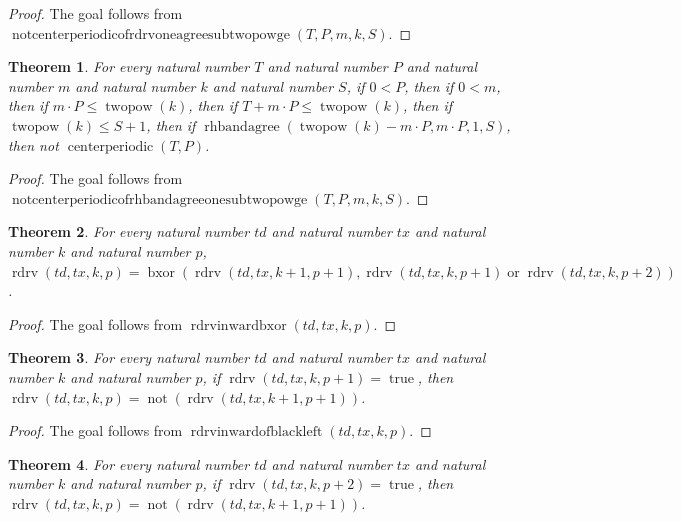 \documentclass[11pt]{article}
\newtheorem{theorem}{Theorem}[section]
\theoremstyle{definition}
\begin{document}
\begin{proof}
The goal follows from \(\operatorname{notcenterperiodicofrdrvoneagreesubtwopowge}(T, P, m, k, S)\).
\end{proof}
\begin{theorem}
\label{ll:paper:not-centerperiodic-of-rhbandagree-one-sub-twopow-ge}
For every natural number \(T\) and natural number \(P\) and natural number \(m\) and natural number \(k\) and natural number \(S\), if \(0 < P\), then if \(0 < m\), then if \(m \cdot P \le \operatorname{twopow}(k)\), then if \(T + m \cdot P \le \operatorname{twopow}(k)\), then if \(\operatorname{twopow}(k) \le S + 1\), then if \(\operatorname{rhbandagree}(\operatorname{twopow}(k) - m \cdot P, m \cdot P, 1, S)\), then not \(\operatorname{centerperiodic}(T, P)\).
\end{theorem}
\begin{proof}
The goal follows from \(\operatorname{notcenterperiodicofrhbandagreeonesubtwopowge}(T, P, m, k, S)\).
\end{proof}
\begin{theorem}
\label{ll:paper:rdrv-inward-bxor}
For every natural number \(td\) and natural number \(tx\) and natural number \(k\) and natural number \(p\), \(\operatorname{rdrv}(td, tx, k, p) = \operatorname{bxor}(\operatorname{rdrv}(td, tx, k + 1, p + 1), \operatorname{rdrv}(td, tx, k, p + 1) \operatorname{or} \operatorname{rdrv}(td, tx, k, p + 2))\).
\end{theorem}
\begin{proof}
The goal follows from \(\operatorname{rdrvinwardbxor}(td, tx, k, p)\).
\end{proof}
\begin{theorem}
\label{ll:paper:rdrv-inward-of-black-left}
For every natural number \(td\) and natural number \(tx\) and natural number \(k\) and natural number \(p\), if \(\operatorname{rdrv}(td, tx, k, p + 1) = \operatorname{true}\), then \(\operatorname{rdrv}(td, tx, k, p) = \operatorname{not}(\operatorname{rdrv}(td, tx, k + 1, p + 1))\).
\end{theorem}
\begin{proof}
The goal follows from \(\operatorname{rdrvinwardofblackleft}(td, tx, k, p)\).
\end{proof}
\begin{theorem}
\label{ll:paper:rdrv-inward-of-black-right}
For every natural number \(td\) and natural number \(tx\) and natural number \(k\) and natural number \(p\), if \(\operatorname{rdrv}(td, tx, k, p + 2) = \operatorname{true}\), then \(\operatorname{rdrv}(td, tx, k, p) = \operatorname{not}(\operatorname{rdrv}(td, tx, k + 1, p + 1))\).
\end{theorem}
\end{document}
